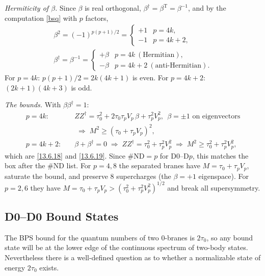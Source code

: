 \begin{tcolorbox}[breakable]
\begin{remark}
		\textit{Hermiticity of $\beta$.} Since $\beta$ is real orthogonal, $\beta^\dagger=\beta^{\mathrm T}=\beta^{-1}$, and by the computation \eqref{bsq} with $p$ factors,
		\begin{gather*}
			\beta^2=(-1)^{p(p+1)/2}=\begin{cases}+1 & p=4k,\\ -1 & p=4k+2,\end{cases}\\
			\beta^\dagger=\beta^{-1}=\begin{cases}+\beta & p=4k \ (\text{Hermitian}),\\ -\beta & p=4k+2 \ (\text{anti-Hermitian}).\end{cases}
		\end{gather*}
		For $p=4k$: $p(p+1)/2=2k(4k+1)$ is even. For $p=4k+2$: $(2k+1)(4k+3)$ is odd.

		\textit{The bounds.} With $\beta\beta^\dagger=1$:
		\begin{align*}
			p=4k:&\quad ZZ^\dagger=\tau_0^2+2\tau_0\tau_pV_p\,\beta+\tau_p^2V_p^2,\ \ \beta=\pm1\text{ on eigenvectors}\\ &\quad\;\Longrightarrow\; M^2\ge(\tau_0+\tau_pV_p)^2,\\
			p=4k+2:&\quad \beta+\beta^\dagger=0 \;\Longrightarrow\; ZZ^\dagger=\tau_0^2+\tau_p^2V_p^2 \;\Longrightarrow\; M^2\ge\tau_0^2+\tau_p^2V_p^2 ,
		\end{align*}
		which are \eqref{13.6.18} and \eqref{13.6.19}. Since $\#\mathrm{ND}=p$ for D0--D$p$, this matches the box after the $\#\mathrm{ND}$ list. For $p=4,8$ the separated branes have $M=\tau_0+\tau_pV_p$, saturate the bound, and preserve 8 supercharges (the $\beta=+1$ eigenspace). For $p=2,6$ they have $M=\tau_0+\tau_pV_p>(\tau_0^2+\tau_p^2V_p^2)^{1/2}$ and break all supersymmetry.
	\end{remark}
\end{tcolorbox}

\subsection*{D0--D0 Bound States}

The BPS bound for the quantum numbers of two 0-branes is $2\tau_0$, so any bound state will be at the lower edge of the continuous spectrum of two-body states. Nevertheless there is a well-defined question as to whether a normalizable state of energy $2\tau_0$ exists.

